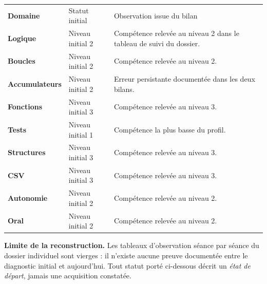 \documentclass[10pt,a4paper]{article}
\begin{document}
\par\noindent\begin{tabularx}{\linewidth}{>{\bfseries}p{32mm} p{28mm} X}
\rowcolor{Navy}\color{white}Domaine & \color{white}Statut initial & \color{white}Observation issue du bilan \\
Logique & Niveau initial 2 & Compétence relevée au niveau 2 dans le tableau de suivi du dossier. \\
Boucles & Niveau initial 2 & Compétence relevée au niveau 2. \\
Accumulateurs & Niveau initial 2 & Erreur persistante documentée dans les deux bilans. \\
Fonctions & Niveau initial 3 & Compétence relevée au niveau 3. \\
Tests & Niveau initial 1 & Compétence la plus basse du profil. \\
Structures & Niveau initial 3 & Compétence relevée au niveau 3. \\
CSV & Niveau initial 3 & Compétence relevée au niveau 3. \\
Autonomie & Niveau initial 2 & Compétence relevée au niveau 2. \\
Oral & Niveau initial 2 & Compétence relevée au niveau 2. \\
\end{tabularx}
\begin{warningbox}\textbf{Limite de la reconstruction.} Les tableaux d'observation séance par séance du dossier individuel sont vierges : il n'existe aucune preuve documentée entre le diagnostic initial et aujourd'hui. Tout statut porté ci-dessous décrit un \emph{état de départ}, jamais une acquisition constatée.\end{warningbox}
\newpage{}
\end{document}
